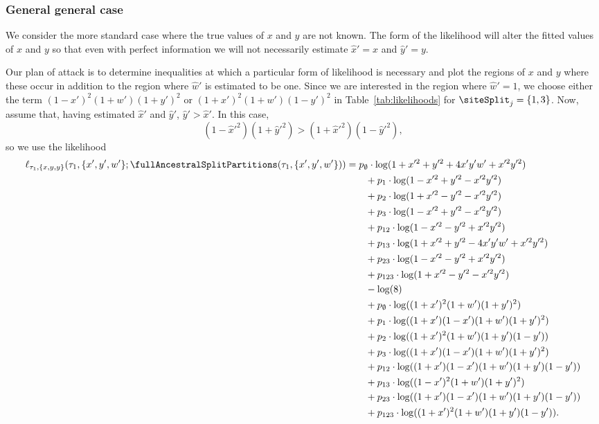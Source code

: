 \subsubsection{General general case}

We consider the more standard case where the true values of $x$ and $y$ are not known.
The form of the likelihood will alter the fitted values of $x$ and $y$ so that even with perfect information we will not necessarily estimate $\hat{x}'=x$ and $\hat{y}'=y$.

Our plan of attack is to determine inequalities at which a particular form of likelihood is necessary and plot the regions of $x$ and $y$ where these occur in addition to the region where $\hat{w}'$ is estimated to be one.
Since we are interested in the region where $\hat{w}'=1$, we choose either the term $(1-x')^2(1+w')(1+y')^2$ or $(1+x')^2(1+w')(1-y')^2$ in Table~\ref{tab:likelihoods} for $\siteSplit_j=\{1,3\}$.
Now, assume that, having estimated $\hat{x}'$ and $\hat{y}'$, $\hat{y}' > \hat{x}'$.
In this case,
$$
(1-\hat{x}'^2)(1+\hat{y}'^2) > (1+\hat{x}'^2)(1-\hat{y}'^2),
$$
so we use the likelihood
\begin{align*}
    \ell_{\tau_1,\{x,y,y\}}(\tau_1, \{x',y',w'\}; \fullAncestralSplitPartitions(\tau_1,\{x',y',w'\}))
    &=        p_{\emptyset}  \cdot\log(1+x'^2+y'^2+4x'y'w'+x'^2y'^2) \\
    &\qquad + p_{1}          \cdot\log(1-x'^2+y'^2-x'^2y'^2) \\
    &\qquad + p_{2}          \cdot\log(1+x'^2-y'^2-x'^2y'^2) \\
    &\qquad + p_{3}          \cdot\log(1-x'^2+y'^2-x'^2y'^2) \\
    &\qquad + p_{12}         \cdot\log(1-x'^2-y'^2+x'^2y'^2) \\
    &\qquad + p_{13}         \cdot\log(1+x'^2+y'^2-4x'y'w'+x'^2y'^2) \\
    &\qquad + p_{23}         \cdot\log(1-x'^2-y'^2+x'^2y'^2) \\
    &\qquad + p_{123}        \cdot\log(1+x'^2-y'^2-x'^2y'^2) \\
    &\qquad - \log(8) \\
    &\qquad + p_{\emptyset}  \cdot\log((1+x')^2   (1+w')(1+y')^2) \\
    &\qquad + p_{1}          \cdot\log((1+x')(1-x')(1+w')(1+y')^2) \\
    &\qquad + p_{2}          \cdot\log((1+x')^2   (1+w')(1+y')(1-y')) \\
    &\qquad + p_{3}          \cdot\log((1+x')(1-x')(1+w')(1+y')^2) \\
    &\qquad + p_{12}         \cdot\log((1+x')(1-x')(1+w')(1+y')(1-y')) \\
    &\qquad + p_{13}         \cdot\log((1-x')^2   (1+w')(1+y')^2) \\
    &\qquad + p_{23}         \cdot\log((1+x')(1-x')(1+w')(1+y')(1-y')) \\
    &\qquad + p_{123}        \cdot\log((1+x')^2   (1+w')(1+y')(1-y')).
\end{align*}
